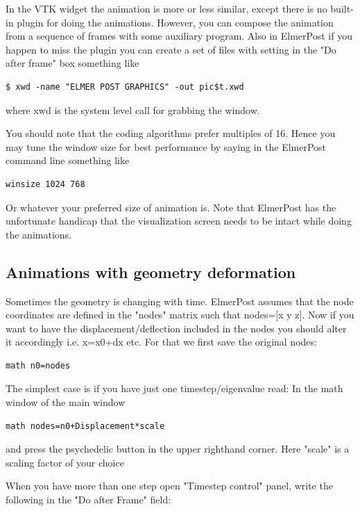 In the VTK widget the animation is more or less similar, except there is no built-in plugin for doing the animations. However, you can compose the animation from a sequence of frames with some auxiliary program. Also in ElmerPost if you happen to miss the plugin you can create a set of files with setting in the "Do after frame" box something like

\begin{verbatim}
$ xwd -name "ELMER POST GRAPHICS" -out pic$t.xwd
\end{verbatim}

where xwd is the system level call for grabbing the window.

You should note that the coding algorithms prefer multiples of 16. Hence you may tune the window size for best performance by saying in the ElmerPost command line something like

\begin{verbatim}
winsize 1024 768
\end{verbatim}

Or whatever your preferred size of animation is. Note that ElmerPost has the unfortunate handicap that the visualization screen needs to be intact while doing the animations.

\subsection{Animations with geometry deformation}

Sometimes the geometry is changing with time. ElmerPost assumes that the node coordinates are defined in the "nodes" matrix such that nodes=[x y z]. Now if you want to have the displacement/deflection included in the nodes you should alter it accordingly i.e. x=x0+dx etc. For that we first save the original nodes:

\begin{verbatim}
math n0=nodes
\end{verbatim}

The simplest case is if you have just one timestep/eigenvalue read: In the math window of the main window

\begin{verbatim}
math nodes=n0+Displacement*scale
\end{verbatim}

and press the psychedelic button in the upper righthand corner. Here "scale" is a scaling factor of your choice

When you have more than one step open "Timestep control" panel, write the following in the "Do after Frame" field:

